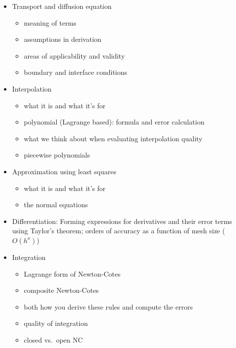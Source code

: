 \documentclass[12pt]{article}
\begin{document}
\begin{itemize}
\item Transport and diffusion equation
  \begin{itemize}
  \item meaning of terms
  \item assumptions in derivation
  \item areas of applicability and validity
  \item boundary and interface conditions
  \end{itemize}

\item Interpolation 
  \begin{itemize}
  \item what it is and what it's for  
  \item polynomial (Lagrange based): formula and error calculation 
  \item what we think about when evaluating interpolation quality
  \item piecewise polynomials
  \end{itemize}

\item Approximation using least squares
  \begin{itemize}
  \item what it is and what it's for  
  \item the normal equations
  \end{itemize}

\item Differentiation: Forming expressions for derivatives and their error terms using Taylor's theorem; orders of accuracy as a function of mesh size ($O(h^{x})$)

\item Integration
  \begin{itemize}
  \item Lagrange form of Newton-Cotes
  \item composite Newton-Cotes
  \item both how you derive these rules and compute the errors
  \item quality of integration
  \item closed vs.\ open NC
  \end{itemize}


\end{itemize}
\end{document}

